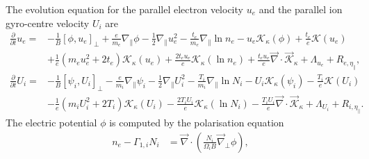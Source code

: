 The evolution equation for the parallel electron velocity \(u_e\) and the parallel ion gyro-centre velocity \(U_i\) are
\begin{align}
\frac{\partial}{\partial t}  u_e
      =&
      - \frac{1 }{ B} \left[ \phi, u_e  \right]_{\perp}
      +  \frac{e}{m_e}   \nabla_\parallel \phi
      -   \frac{1}{2}   \nabla_\parallel u_e^2
      - \frac{t_e}{m_e } \nabla_\parallel \ln  n_e
     - u_e   \mathcal{K}_{\kappa} \left( \phi  \right)
     + \frac{t_e}{e} \mathcal{K}\left(  u_e \right)
     \nonumber  \\    &
     + \frac{1}{e} \left(m_e  u_e^2 +  2  t_e\right)\mathcal{K}_{\kappa} \left(u_e\right)
    + \frac{2  t_e u_e }{ e} \mathcal{K}_{\kappa} \left(\ln n_e \right)
    + \frac{t_e  u_e }{e} \vec{\nabla} \cdot  \vec{\mathcal{K}}_{\kappa}
    +\Lambda_{u_e} + R_{e, \eta_\parallel},  \\
\frac{\partial}{\partial t}    U_i
      =&
      - \frac{1 }{ B} \left[ \psi_i, U_i  \right]_{\perp}
      -  \frac{e}{m_i}   \nabla_\parallel \psi_i
      -     \frac{1}{2}  \nabla_\parallel U_i^2
      - \frac{T_i}{m_i } \nabla_\parallel \ln  N_i
     -  U_i  \mathcal{K}_{\kappa} \left( \psi_i  \right)
     - \frac{T_i}{e} \mathcal{K}\left(  U_i \right)
     \nonumber  \\    &
           - \frac{1}{e}\left(m_i  U_i^2 + 2  T_i \right) \mathcal{K}_{\kappa} \left(U_i\right)
           - \frac{2  T_i U_i }{ e} \mathcal{K}_{\kappa} \left(\ln N_i \right)
           - \frac{T_i  U_i }{e} \vec{\nabla} \cdot  \vec{\mathcal{K}}_{\kappa}
           +\Lambda_{U_i} + R_{i,\eta_\parallel} .
\end{align}
The electric potential \(\phi\) is computed by the polarisation equation
\begin{align}
  n_e -\Gamma_{1,i} N_i &= \vec{\nabla} \cdot\left(\frac{N_i}{\Omega_i B} \vec{\nabla}_\perp \phi\right),
  \label{eq:polarisation_dimensional}
\end{align}
